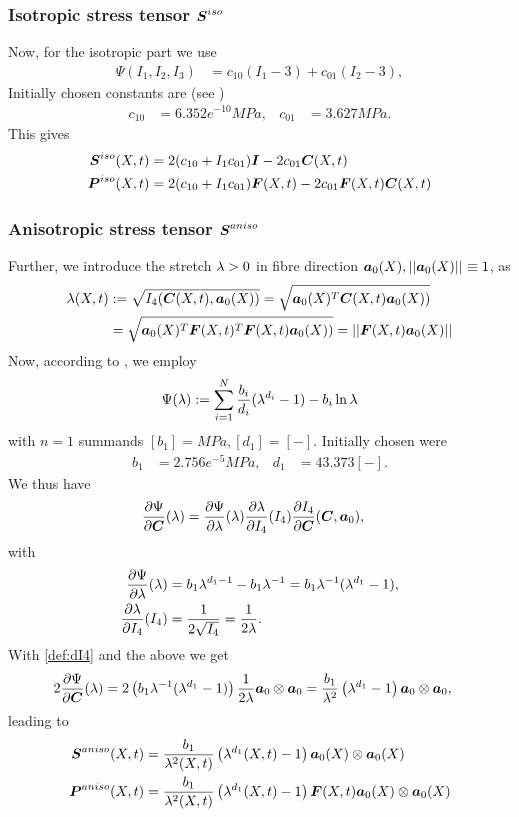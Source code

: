 \subsubsection{Isotropic stress tensor $\boldsymbol{S}^{iso}$}
Now, for the isotropic part we use
\begin{align*}
	\Psi(I_1,I_2,I_3) &= c_{10}(I_1-3) + c_{01}(I_2-3), 
\end{align*}
Initially chosen constants are (see \cite{Zheng1999})
\begin{align}
	c_{10} &= 6.352e^{-10}MPa, & c_{01} &= 3.627MPa.
\end{align}
This  gives
\begin{align}
	\boldsymbol{S}^{iso}(X,t) &= 2(c_{10} + I_1c_{01})\boldsymbol{I} - 2c_{01}\boldsymbol{C}(X,t)\\
	\boldsymbol{P}^{iso}(X,t) &= 2(c_{10} + I_1c_{01})\boldsymbol{F}(X,t) - 2c_{01}\boldsymbol{F}(X,t)\boldsymbol{C}(X,t)
\end{align}

\subsubsection{Anisotropic stress tensor $\boldsymbol{S}^{aniso}$}
Further, we introduce the stretch $\lambda > 0$ in fibre direction $\boldsymbol{a}_0(X), \left|\left|\boldsymbol{a}_0(X)\right|\right|_{} \equiv 1$, as
\begin{align}
	\lambda(X,t) &:= \sqrt{I_4(\boldsymbol{C}(X,t),\boldsymbol{a}_0(X))} = \sqrt{\boldsymbol{a}_0(X)^T\boldsymbol{C}(X,t)\boldsymbol{a}_0(X))}\\
	&= \sqrt{\boldsymbol{a}_0(X)^T\boldsymbol{F}(X,t)^T\boldsymbol{F}(X,t)\boldsymbol{a}_0(X))} = \left|\left|\boldsymbol{F}(X,t)\boldsymbol{a}_0(X)\right|\right|_{}\label{def:fibrestretch}
\end{align}
Now, according to \cite{Markert2005}, we employ
\begin{align}
	\Psi(\lambda) := \sum\limits_{i=1}^{N} \frac{b_i}{d_i}(\lambda^{d_i} - 1) - b_i\ln\lambda\label{def:markertlaw}
\end{align}
with $n=1$ summands $[b_1] = MPa, [d_1] = [-]$.
Initially chosen were 
\begin{align*}
	b_1 &= 2.756e^{-5}MPa, & d_1 &= 43.373 [-].
\end{align*}
We thus have
\begin{align}
	\frac{\partial \Psi}{\partial \boldsymbol{C}}(\lambda) &= \frac{\partial \Psi}{\partial \lambda}(\lambda)\frac{\partial \lambda}{\partial I_4}(I_4)\frac{\partial I_4}{\partial \boldsymbol{C}}(\boldsymbol{C},\boldsymbol{a}_0),\label{eq:dpsidC}
\end{align}
with
\begin{align*}
		 \frac{\partial \Psi}{\partial \lambda}(\lambda) &= b_1\lambda^{d_1-1} - b_1\lambda^{-1} = b_1\lambda^{-1}(\lambda^{d_1} - 1),\\
		 \frac{\partial \lambda}{\partial I_4}(I_4) &= \frac{1}{2\sqrt{I_4}} = \frac{1}{2\lambda}.
\end{align*}
With \eqref{def:dI4} and the above we get
\begin{align*}
	2\frac{\partial \Psi}{\partial \boldsymbol{C}}(\lambda) &= 2\left(b_1\lambda^{-1}(\lambda^{d_1} - 1)\right) \frac{1}{2\lambda}\boldsymbol{a}_0\otimes\boldsymbol{a}_0
	= \frac{b_1}{\lambda^2}\left(\lambda^{d_1} - 1\right) \boldsymbol{a}_0\otimes\boldsymbol{a}_0,
\end{align*}
leading to
\begin{align}
	\boldsymbol{S}^{aniso}(X,t) &= \frac{b_1}{\lambda^2(X,t)}\left(\lambda^{d_1}(X,t) - 1\right) \boldsymbol{a}_0(X)\otimes\boldsymbol{a}_0(X)\\
	\boldsymbol{P}^{aniso}(X,t) &= \frac{b_1}{\lambda^2(X,t)}\left(\lambda^{d_1}(X,t) - 1\right) \boldsymbol{F}(X,t)\boldsymbol{a}_0(X)\otimes\boldsymbol{a}_0(X)
\end{align}


